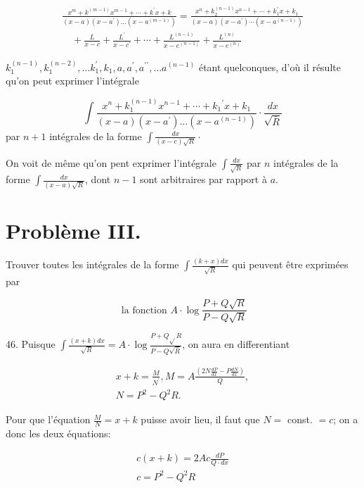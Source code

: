 \documentclass{article}
\begin{document}
\[
\begin{array}{r}
\frac{x^{m}+k^{(m-1)} x^{m-1}+\cdots+k^{\prime} x+k}{(x-a)\left(x-a^{\prime}\right) \ldots\left(x-a^{(m-1)}\right)}=\frac{x^{n}+k_{2}^{(n-1)} x^{n-1}+\cdots+k_{1}^{\prime} x+k_{1}}{(x-a)\left(x-a^{\prime}\right) \cdots\left(x-a^{(n-1)}\right)} \\
\quad+\frac{L}{x-c}+\frac{L^{\prime}}{x-c^{\prime}}+\cdots+\frac{L^{(n-1)}}{x-e^{(n-1)}}+\frac{L^{(n)}}{x-e^{(n)}}
\end{array}
\]

\(k_{1}^{(n-1)}, k_{1}^{(n-2)}, \ldots k_{1}^{\prime}, k_{1}, a, a^{\prime}, a^{\prime \prime}, \ldots a^{(n-1)}\) étant quelconques, d'où il résulte qu'on peut exprimer l'intégrale

\[
\int \frac{x^{n}+k_{1}^{(n-1)} x^{n-1}+\cdots+k_{1}{ }^{\prime} x+k_{1}}{(x-a)\left(x-a^{\prime}\right) \ldots\left(x-a^{(n-1)}\right)} \cdot \frac{d x}{\sqrt{\bar{R}}}
\]
par \(n+1\) intégrales de la forme \(\int \frac{d x}{(x-c) \sqrt{R}} \cdot\)

On voit de même qu'on pent exprimer l'intégrale \(\int \frac{d x}{\sqrt{R}}\) par \(n\) intégrales de la forme \(\int \frac{d x}{(x-a) \sqrt{R}}\), dont \(n-1\) sont arbitraires par rapport à \(a\).

\section*{Problème III.}

Trouver toutes les intégrales de la forme \(\int \frac{(k+x) d x}{\sqrt{R}}\) qui peuvent être exprimées par

\[
\text { la fonction } A \cdot \log \frac{P+Q \sqrt{R}}{P-Q \sqrt{R}}
\]

46. Puisque \(\int \frac{(x+k) d x}{\sqrt{R}}=A \cdot \log \frac{P+Q \sqrt{ } R}{P-Q \sqrt{\bar{R}}}\), on aura en differentiant

\[
\begin{gathered}
x+k=\frac{M}{N^{\prime}}, M=A \frac{\left(2 N \frac{d P}{d x}-P \frac{d N}{d x}\right)}{Q}, \\
N=P^{2}-Q^{2} R .
\end{gathered}
\]

Pour que l'équation \(\frac{M}{N}=x+k\) puisse avoir lieu, il faut que \(N=\) const. \(=c\); on a donc les deux équations:

\[
\begin{gathered}
c(x+k)=2 A c \frac{d P}{Q \cdot d x} \\
c=P^{2}-Q^{2} R
\end{gathered}
\]
\end{document}

